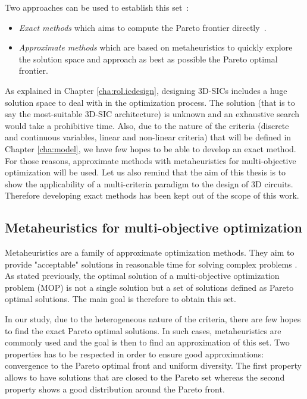 Two approaches can be used to establish this set~\cite{Vin92}:
\begin{itemize}
\item \textit{Exact methods} which aims to compute the Pareto frontier directly~\cite{EhrgottGandibleuxbook02,steuer86a}.
\item \textit{Approximate methods} which are based on metaheuristics to quickly explore the solution space and approach as best as possible the Pareto optimal frontier\cite{talbi09}.
\end{itemize}
As explained in Chapter \ref{cha:rol.icdesign}, designing 3D-SICs includes a huge solution space to deal with in the optimization process. The solution (that is to say the most-suitable 3D-SIC architecture) is unknown and an exhaustive search would take a prohibitive time. Also, due to the nature of the criteria (discrete and continuous variables, linear and non-linear criteria) that will be defined in Chapter \ref{cha:model}, we have few hopes to be able to develop an exact method. For those reasons, approximate methods with metaheuristics for multi-objective optimization will be used. Let us also remind that the aim of this thesis is to show the applicability of a multi-criteria paradigm to the design of 3D circuits. Therefore developing exact methods has been kept out of the scope of this work.

\subsection{Metaheuristics for multi-objective optimization}
\label{subsec:metaheuristics}
Metaheuristics are a family of approximate optimization methods. They aim to provide "acceptable" solutions in reasonable time for solving complex problems \cite{talbi09}. As stated previously, the optimal solution of a multi-objective optimization problem (MOP) is not a single solution but a set of solutions defined as Pareto optimal solutions. The main goal is therefore to obtain this set.

In our study, due to the heterogeneous nature of the criteria, there are few hopes to find the exact Pareto optimal solutions. In such cases, metaheuristics are commonly used and the goal is then to find an approximation of this set. Two properties has to be respected in order to ensure good approximations: convergence to the Pareto optimal front and uniform diversity. The first property allows to have solutions that are closed to the Pareto set whereas the second property shows a good distribution around the Pareto front.

